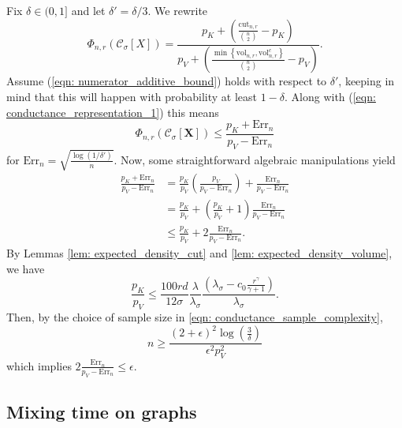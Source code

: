 \documentclass{article}
\newcommand{\set}[1]{\left\{#1\right\}}
\newcommand{\vol}{\mathrm{vol}}
\newcommand{\cut}{\mathrm{cut}}
\newcommand{\1}{\mathbf{1}}
\newcommand{\Err}{\mathrm{Err}}
\newcommand{\Xbf}{X}             %
\newcommand{\Cset}{\mathcal{C}}
\newcommand{\Csig}{\Cset_{\sigma}}
\theoremstyle{aldenthm}
\theoremstyle{aldenrmrk}
\begin{document}
Fix $\delta \in (0,1]$ and let $\delta' = \delta/3$. We rewrite
\begin{equation}
\label{eqn: conductance_representation_1}
\Phi_{n,r}(\Csig[\Xbf]) = \frac{p_K + \left(\frac{\cut_{n,r}}{{n \choose 2}} - p_K\right)}{p_V + \left(\frac{\min\set{\vol_{n,r}, \vol_{n,r}^c}}{{n \choose 2}} - p_V\right)}.
\end{equation}
Assume (\ref{eqn: numerator_additive_bound}) holds with respect to $\delta'$, keeping in mind that this will happen with probability at least $1 - \delta$. Along with (\ref{eqn: conductance_representation_1}) this means
\begin{equation*}
\Phi_{n,r}(\Csig[\mathbf{X}]) \leq \frac{p_K + \Err_n}{p_V - \Err_n}
\end{equation*}
for $\Err_n = \sqrt{\frac{\log(1/\delta')}{n}}$.
Now, some straightforward algebraic manipulations yield
\begin{align*}
\frac{p_K + \Err_n}{p_V - \Err_n} & = \frac{p_K}{p_V} \left(\frac{p_V}{p_V - \Err_n}\right) + \frac{\Err_n}{p_V - \Err_n} \\
& = \frac{p_K}{p_V} + \left(\frac{p_K}{p_V} + 1\right)\frac{\Err_n}{p_V - \Err_n} \\
& \leq \frac{p_K}{p_V} + 2 \frac{\Err_n}{p_V - \Err_n}.
\end{align*}
By Lemmas \ref{lem: expected_density_cut} and \ref{lem: expected_density_volume}, we have
\begin{equation*}
\frac{p_K}{p_V} \leq \frac{100rd}{12\sigma} \frac{\lambda}{\lambda_{\sigma}} \frac{\left(\lambda_{\sigma} - c_0\frac{r^{\gamma}}{\gamma + 1}\right)}{\lambda_{\sigma}}.
\end{equation*}
Then, by the choice of sample size in \eqref{eqn: conductance_sample_complexity}, 
\begin{equation*}
n \geq \frac{(2 + \epsilon)^2 \log\left(\frac{3}{\delta}\right)}{\epsilon^2 p_V^2}
\end{equation*}
which implies $2 \frac{\Err_n}{p_V - \Err_n} \leq \epsilon$. 

\subsection{Mixing time on graphs}
\label{sec: mixing_time_on_graphs}
\end{document}
